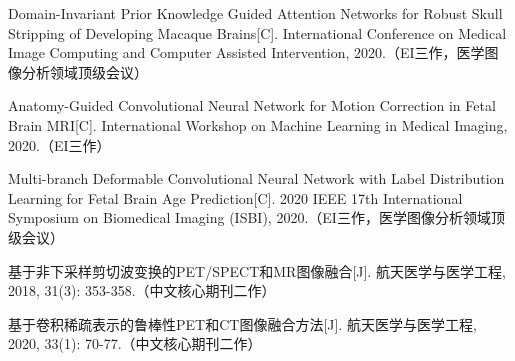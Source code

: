 \noindent [11] Domain-Invariant Prior Knowledge Guided Attention Networks for Robust Skull Stripping of Developing Macaque Brains[C]. International Conference on Medical Image Computing and Computer Assisted Intervention, 2020.（EI三作，医学图像分析领域顶级会议）

\noindent [12] Anatomy-Guided Convolutional Neural Network for Motion Correction in Fetal Brain MRI[C]. International Workshop on Machine Learning in Medical Imaging, 2020.（EI三作）

\noindent [13] Multi-branch Deformable Convolutional Neural Network with Label Distribution Learning for Fetal Brain Age Prediction[C]. 2020 IEEE 17th International Symposium on Biomedical Imaging (ISBI), 2020.（EI三作，医学图像分析领域顶级会议）

\noindent [14] 基于非下采样剪切波变换的PET/SPECT和MR图像融合[J]. 航天医学与医学工程, 2018, 31(3): 353-358.（中文核心期刊二作）

\noindent [15] 基于卷积稀疏表示的鲁棒性PET和CT图像融合方法[J]. 航天医学与医学工程, 2020, 33(1): 70-77.（中文核心期刊二作）